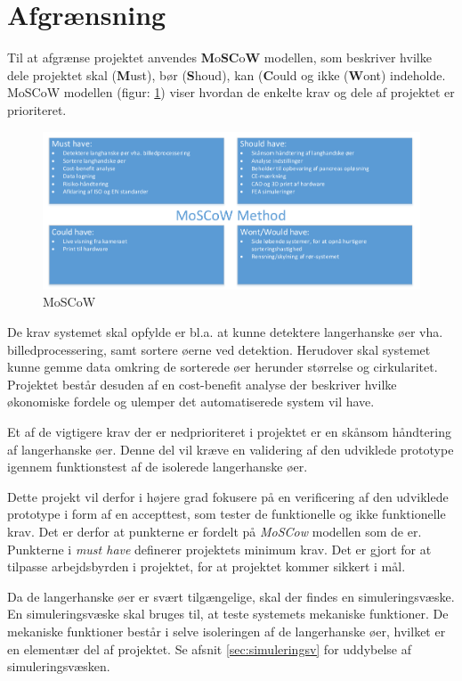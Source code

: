 \newpage
\section{Afgrænsning}
Til at afgrænse projektet anvendes \textbf{M}o\textbf{SC}o\textbf{W} modellen, som beskriver hvilke dele projektet skal (\textbf{M}ust), bør (\textbf{S}houd), kan (\textbf{C}ould og ikke (\textbf{W}ont) indeholde. MoSCoW modellen (figur: \ref{fig:moscow}) viser hvordan de enkelte krav og dele af projektet er prioriteret. 


\begin{figure}[H]
	\centering
	\includegraphics[width=1\textwidth]{billeder/MoSCoW-crop.pdf}
	\caption{MoSCoW}
	\label{fig:moscow}
\end{figure}

De krav systemet skal opfylde er bl.a. at kunne detektere langerhanske øer vha. billedprocessering, samt sortere øerne ved detektion. Herudover skal systemet kunne gemme data omkring de sorterede øer herunder størrelse og cirkularitet. Projektet består desuden af en cost-benefit analyse der beskriver hvilke økonomiske fordele og ulemper det automatiserede system vil have. 

Et af de vigtigere krav der er nedprioriteret i projektet er en skånsom håndtering af langerhanske øer. Denne del vil kræve en validering af den udviklede prototype igennem funktionstest af de isolerede langerhanske øer. %

Dette projekt vil derfor i højere grad fokusere på en verificering af den udviklede prototype i form af en accepttest, som tester de funktionelle og ikke funktionelle krav. Det er derfor at punkterne er fordelt på \textit{MoSCow} modellen som de er. Punkterne i \textit{must have} definerer projektets minimum krav. Det er gjort for at tilpasse arbejdsbyrden i projektet, for at projektet kommer sikkert i mål.

Da de langerhanske øer er svært tilgængelige, skal der findes en simuleringsvæske. En simuleringsvæske skal bruges til, at teste systemets mekaniske funktioner. De mekaniske funktioner består i selve isoleringen af de langerhanske øer, hvilket er en elementær del af projektet. Se afsnit \ref{sec:simuleringsv} for uddybelse af simuleringsvæsken.

